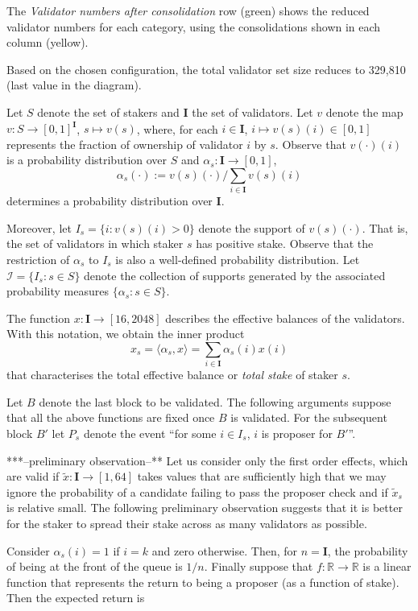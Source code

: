 \documentclass{article}
\newcommand{\eb}{x}
\newcommand{\teb}{\tilde{\eb}}
\newcommand{\mc}{\mathcal}
\begin{document}
The \emph{Validator numbers after consolidation} row (green) shows the reduced validator numbers for each category, using the consolidations shown in each column (yellow).

Based on the chosen configuration, the total validator set size reduces to 329,810 (last value in the diagram).


Let $S$ denote the set of stakers and $\mathbf I$ the set of validators. Let
$v$ denote the map $v: S \rightarrow [0, 1]^\mathbf I$, $s \mapsto v(s)$,
where, for each $i \in \mathbf I$, $i \mapsto v(s)(i) \in [0, 1]$ represents the
fraction of ownership of validator $i$ by $s$.
Observe that $v(\cdot)(i)$ is a probability distribution over $S$ and
$\alpha_s: \mathbf I \rightarrow [0, 1]$, 
\[\alpha_s (\cdot) := v(s)(\cdot) / \sum_{i \in \mathbf I} v(s)(i)\] 
determines a probability distribution over $\mathbf I$.

Moreover, let $I_s = \{i : v(s)(i) > 0\}$ denote the support of $v(s)(\cdot)$.
That is, the set of validators in which staker $s$ has positive stake. Observe
that the restriction of $\alpha_s$ to $I_s$ is also a well-defined probability
distribution. Let $\mc I = \{I_s : s \in S\}$ denote the collection
of supports generated by the associated probability measures $\{\alpha_s: s \in
S\}$.

The function $\eb : \mathbf I \rightarrow [16, 2048]$ describes the effective
balances of the validators.  With this notation, we obtain the inner product
\[\eb_s = \langle \alpha_s, \eb\rangle = \sum_{i \in \mathbf I} \alpha_s(i)\eb(i)\] 
that characterises the total effective balance or \emph{total stake} of staker $s$.

Let $B$ denote the last block to be validated. The following arguments suppose
that all the above functions are fixed once $B$ is validated. For the
subsequent block $B'$ let $P_s$ denote the event ``for some $i \in I_s$, $i$ is
proposer for $B'$''.

***--preliminary observation--**
  Let us consider only the first order effects, which are valid if  $\teb:
  \mathbf I \rightarrow [1, 64]$ takes values that are sufficiently high that
  we may ignore the probability of a candidate failing to pass the proposer
  check and if $\teb_s$ is relative small. The following preliminary
  observation suggests that it is better for the staker to spread their stake
  across as many validators as possible.
 
  Consider $\alpha_s(i) = 1$ if $i = k$ and zero otherwise.
  Then, for $n = \mathbf I$, the probability of being at the
  front of the queue is $1 / n$. Finally suppose that $f: \mathbb R \rightarrow
  \mathbb R$ is a linear function that represents the return to being a
  proposer (as a function of stake). Then the expected return is 
\end{document}
